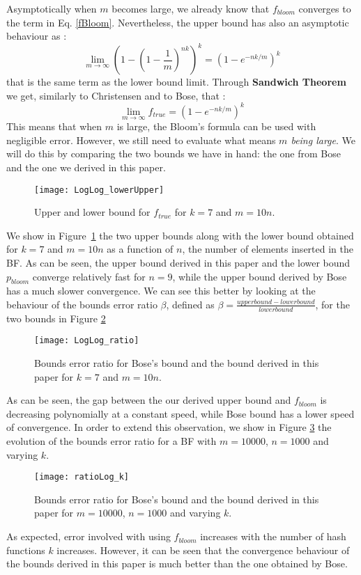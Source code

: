 Asymptotically when $m$ becomes large, we already know that $f_{bloom}$ converges to the term in Eq. \ref{fBloom}. Nevertheless, the upper bound has also an asymptotic behaviour as :
\begin{equation}
\label{flim}
\lim\limits_{m \to \infty} \left(1-\left(1-\frac{1}{m}\right)^{nk}\right)^k = \left(1-e^{-nk/m}\right)^k 
\end{equation}
that is the same term as the lower bound limit. Through \textbf{Sandwich Theorem} we get, similarly to Christensen and to Bose, that :
\begin{equation}
\label{flimtrue}
\lim\limits_{m \to \infty}  f_{true} =  \left(1-e^{-nk/m}\right)^k 
\end{equation}
This means that when $m$ is large, the Bloom's formula can be used with negligible error. However, we still need to evaluate what means \textit{$m$ being large}. We will do this by comparing the two bounds we have in hand: the one from Bose and the one we derived in this paper. 

\begin{figure}
\centering
\texttt{[image: LogLog\_lowerUpper]}
\caption{Upper and lower bound for $f_{true}$ for $k=7$ and $m=10n$.}
\label{fig:uplowbound}
\end{figure}

We show in Figure~\ref{fig:uplowbound} the two upper bounds along with the lower bound obtained for $k=7$  and $m=10n$ as a function of $n$, the number of elements inserted in the BF. As can be seen, the upper bound derived in this paper and the lower bound $p_{bloom}$ converge relatively fast for $n=9$, while the upper bound derived by Bose has a much slower convergence. We can see this better by looking at the behaviour of the bounds error ratio $\beta$, defined as $\beta=\frac{upper bound - lower bound}{lower bound}$, for the two bounds in Figure \ref{fig:ratio}
\begin{figure}
\centering
\texttt{[image: LogLog\_ratio]}
\caption{Bounds error ratio for Bose's bound and the bound derived in this paper for $k=7$ and $m=10n$. }
\label{fig:ratio}
\end{figure}
As can be seen, the gap between the our derived upper bound and $f_{bloom}$ is decreasing polynomially at a constant speed, while Bose bound has a lower speed of convergence. In order to extend this observation, we show in Figure \ref{fig:ratiok} the evolution of the bounds error ratio for a BF with $m=10000$, $n=1000$ and varying $k$. 
\begin{figure}
\centering
\texttt{[image: ratioLog\_k]}
\caption{Bounds error ratio for Bose's bound and the bound derived in this paper for $m=10000$, $n=1000$ and varying $k$.}
\label{fig:ratiok}
\end{figure}
As expected, error involved with using $f_{bloom}$ increases with the number of hash functions $k$ increases. However, it can be seen that the convergence behaviour of the bounds derived in this paper is much better than the one obtained by Bose. 



